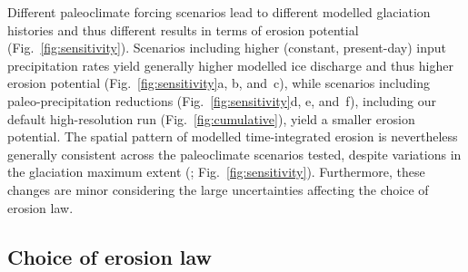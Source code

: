 \documentclass[esurf, manuscript]{copernicus}
\begin{document}
    Different paleoclimate forcing scenarios lead to different modelled
    glaciation histories \citep[cf.][]{Seguinot.etal.2018} and thus different
    results in terms of erosion
    potential (Fig.~\ref{fig:sensitivity}). Scenarios including higher
    (constant, present-day) input precipitation rates yield generally higher
    modelled ice discharge and thus higher
    erosion potential (Fig.~\ref{fig:sensitivity}a, b, and~c), while scenarios
    including paleo-precipitation reductions (Fig.~\ref{fig:sensitivity}d, e,
    and~f), including our default high-resolution run
    (Fig.~\ref{fig:cumulative}), yield a smaller erosion potential. The spatial
    pattern of modelled time-integrated erosion is nevertheless generally
    consistent across the paleoclimate scenarios tested,
    despite variations in the glaciation maximum extent
    (\citealp[Fig.~3 in][]{Seguinot.etal.2018}; Fig.~\ref{fig:sensitivity}).
    Furthermore, these changes are minor
    considering the large uncertainties affecting the choice of erosion law.

\subsection{Choice of erosion law}
\label{sec:powerlaws}
\end{document}
